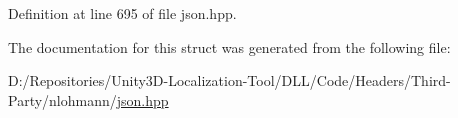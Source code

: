 Definition at line 695 of file json.\+hpp.



The documentation for this struct was generated from the following file\+:\begin{DoxyCompactItemize}
\item 
D\+:/\+Repositories/\+Unity3\+D-\/\+Localization-\/\+Tool/\+D\+L\+L/\+Code/\+Headers/\+Third-\/\+Party/nlohmann/\mbox{\hyperlink{json_8hpp}{json.\+hpp}}\end{DoxyCompactItemize}

